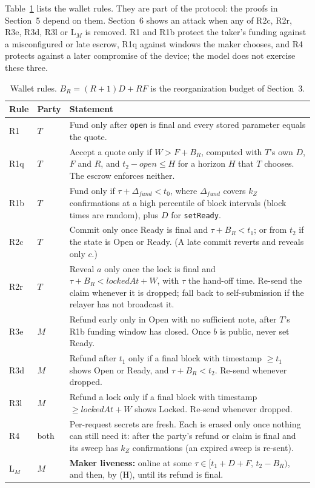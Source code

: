 \documentclass[10pt,letterpaper]{article}
\theoremstyle{plain}
\theoremstyle{definition}
\newcommand{\fn}[1]{\texttt{#1}}
\newcommand{\st}[1]{\textsf{#1}}
\begin{document}
Table~\ref{tab:rules} lists the wallet rules. They are part of the protocol: the proofs in
Section~5 depend on them. Section~6 shows an attack when any of R2c, R2r, R3e, R3d, R3l or L$_M$
is removed. R1 and R1b protect the taker's funding against a misconfigured or late escrow, R1q against windows the maker chooses, and R4
protects against a later compromise of the device; the model does not exercise these three.

\begin{table}[H]
\centering\small
\begin{tabularx}{\linewidth}{@{}l l X@{}}
\toprule
\textbf{Rule} & \textbf{Party} & \textbf{Statement}\\
\midrule
R1 & $T$ & Fund only after \fn{open} is final and every stored parameter equals the quote.\\
R1q & $T$ & Accept a quote only if $W > F + B_R$, computed with $T$'s own $D$, $F$ and $R$, and $t_2 - \mathit{open} \le H$ for a horizon $H$ that $T$ chooses. The escrow enforces neither.\\
R1b & $T$ & Fund only if $\tau + \Delta_{\mathit{fund}} < t_0$, where $\Delta_{\mathit{fund}}$ covers $k_Z$ confirmations at a high percentile of block intervals (block times are random), plus $D$ for \fn{setReady}.\\
R2c & $T$ & Commit only once Ready is final and $\tau + B_R < t_1$; or from $t_2$ if the state is \st{Open} or \st{Ready}. (A late commit reverts and reveals only $c$.)\\
R2r & $T$ & Reveal $a$ only once the lock is final and $\tau + B_R < \mathit{lockedAt} + W$, with $\tau$ the hand-off time. Re-send the claim whenever it is dropped; fall back to self-submission if the relayer has not broadcast it.\\
R3e & $M$ & Refund early only in \st{Open} with no sufficient note, after $T$'s R1b funding window has closed. Once $b$ is public, never set Ready.\\
R3d & $M$ & Refund after $t_1$ only if a final block with timestamp $\ge t_1$ shows \st{Open} or \st{Ready}, and $\tau + B_R < t_2$. Re-send whenever dropped.\\
R3l & $M$ & Refund a lock only if a final block with timestamp $\ge \mathit{lockedAt}+W$ shows \st{Locked}. Re-send whenever dropped.\\
R4 & both & Per-request secrets are fresh. Each is erased only once nothing can still need it: after the party's refund or claim is final and its sweep has $k_Z$ confirmations (an expired sweep is re-sent).\\
L$_M$ & $M$ & \textbf{Maker liveness:} online at some $\tau \in [t_1 + D + F,\, t_2 - B_R)$, and then, by (H), until its refund is final.\\
\bottomrule
\end{tabularx}
\caption{Wallet rules. $B_R = (R+1)D + RF$ is the reorganization budget of Section~3.}
\label{tab:rules}
\end{table}
\end{document}
